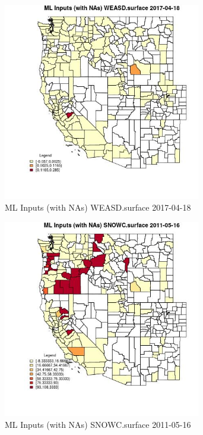 \begin{figure} 
\centering  
\includegraphics[width=0.77\textwidth]{Code_Outputs/Report_ML_input_PM25_Step4_part_e_de_duplicated_aves_compiled_2019-05-20wNAs_CountyWEASDsurfaceMean2017-04-18.jpg} 
\caption{\label{fig:Report_ML_input_PM25_Step4_part_e_de_duplicated_aves_compiled_2019-05-20wNAsCountyWEASDsurfaceMean2017-04-18}ML Inputs (with NAs) WEASD.surface 2017-04-18} 
\end{figure} 
 

\begin{figure} 
\centering  
\includegraphics[width=0.77\textwidth]{Code_Outputs/Report_ML_input_PM25_Step4_part_e_de_duplicated_aves_compiled_2019-05-20wNAs_CountySNOWCsurfaceMean2011-05-16.jpg} 
\caption{\label{fig:Report_ML_input_PM25_Step4_part_e_de_duplicated_aves_compiled_2019-05-20wNAsCountySNOWCsurfaceMean2011-05-16}ML Inputs (with NAs) SNOWC.surface 2011-05-16} 
\end{figure} 
 

